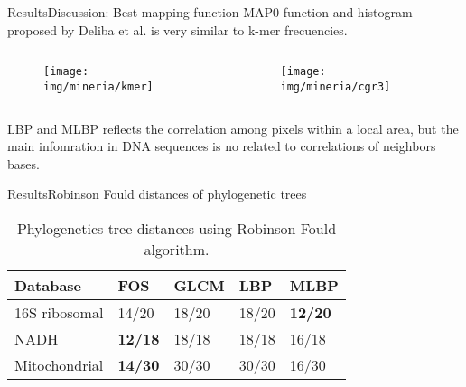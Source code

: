 \documentclass[10pt]{beamer}
\newcommand{\1}{
	\setbeamertemplate{background}{
		\texttt{[image: img/1\_dna]}
		\tikz[overlay] \fill[fill opacity=0.75,fill=white] (0,0) rectangle (-\paperwidth,\paperheight);
	}
}
\begin{document}
\begin{frame}{Results}{Discussion: Best mapping function}
	MAP0 function and histogram proposed by Deliba et al. \cite{delibacs2020dna} is very similar to k-mer frecuencies.  \cite{karlin1994comparisons, campbell1999genome, shedlock2007phylogenomics, wu2001statistical, sims2009alignment, sims2011whole, wu2005optimal, dai2008markov, haubold2014alignment, karamichalis2015investigation, vinga2003alignment}
	
	
	\begin{columns}
		\begin{column}{0.48\textwidth}
			\begin{figure}[]
				\centering
				\texttt{[image: img/mineria/kmer]}		
			\end{figure}
		\end{column}
		\begin{column}{0.48\textwidth}
			\begin{figure}[]
				\centering
				\texttt{[image: img/mineria/cgr3]}		
			\end{figure}
		\end{column}
	\end{columns}
	
	\begin{block}{}
		LBP and MLBP reflects the correlation among pixels within a local area, but the main infomration in DNA sequences is no related to correlations of neighbors bases.
	\end{block}

	

\end{frame}

\begin{frame}{Results}{Robinson Fould distances of phylogenetic trees}
\begin{table}[h]
	\centering
	\caption{Phylogenetics tree distances using Robinson Fould algorithm.}
	\label{tab:robinson}
	\setlength{\tabcolsep}{0.5em} %
	{\renewcommand{\arraystretch}{1}%
		\begin{tabular}{lllll}
			\hline
			Database           &  FOS & GLCM & LBP  & MLBP \\ \hline
			16S ribosomal      & 14/20 & 18/20 & 18/20 & \textbf{12/20} \\ 
			NADH          	   & \textbf{12/18} & 18/18 & 18/18 & 16/18 \\ 
			Mitochondrial      & \textbf{14/30} & 30/30 & 30/30 & 16/30 \\ \hline	
		\end{tabular}
	}
\end{table}
\end{frame}
\end{document}
